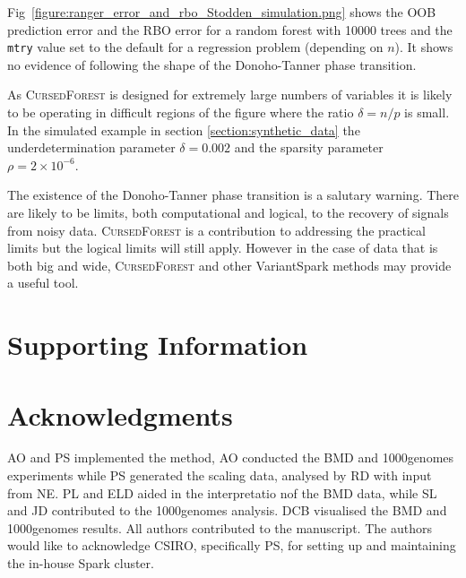 \documentclass[10pt,letterpaper]{article}
\newcommand{\cursedforest}{\textsc{CursedForest}\xspace}
\newcommand{\mtry}{\texttt{mtry}\xspace}
\begin{document}
Fig~\ref{figure:ranger_error_and_rbo_Stodden_simulation.png} shows the OOB prediction error and the RBO error for a
random forest with 10000 trees and the \mtry value set to the default for a regression problem (depending on $n$). It
shows no evidence of following the shape of the Donoho-Tanner phase transition.

As \cursedforest is designed for extremely large numbers of variables it is likely to be operating in difficult regions
of the figure where the ratio $\delta = n/p$ is small. In the simulated example in section \ref{section:synthetic_data}
the underdetermination parameter $\delta = 0.002$ and the sparsity parameter $\rho =2\times 10^{-6}.$

The existence of the Donoho-Tanner phase transition is a salutary warning. There are likely to be limits, both
computational and logical, to the recovery of signals from noisy data. \cursedforest is a contribution to addressing the
practical limits but the logical limits will still apply. However in the case of data that is both big and wide,
\cursedforest and other VariantSpark methods may provide a useful tool.


\clearpage
\section{Supporting Information}



\section*{Acknowledgments}
AO and PS implemented the method, AO conducted the BMD and 1000genomes experiments while PS generated the scaling data,
analysed by RD with input from NE. PL and ELD aided in the interpretatio nof the BMD data, while SL and JD contributed
to the 1000genomes analysis. DCB visualised the BMD and 1000genomes results. All authors contributed to the manuscript.
The authors would like to acknowledge CSIRO, specifically PS, for setting up and maintaining the in-house Spark cluster.

\nolinenumbers


\end{document}
